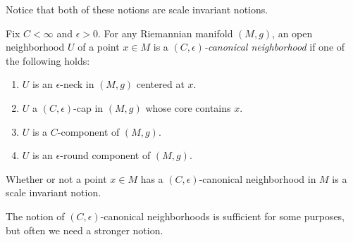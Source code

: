 Notice that both of these notions are scale invariant notions.

\begin{definition}\label{def:canonical-neighborhood}
Fix $C<\infty$ and $\epsilon>0$. For any Riemannian manifold
$(M,g)$,  an open neighborhood $U$ of a point $x\in M$ is a {\em
$(C,\epsilon)$-canonical neighborhood} if one of the following holds:
\begin{enumerate}
\item[(1)] $U$ is an $\epsilon$-neck in $(M,g)$ centered at $x$.
\item[(2)] $U$ a $(C,\epsilon)$-cap in $(M,g)$ whose core contains $x$.
\item[(3)] $U$ is a $C$-component of $(M,g)$.
\item[(4)] $U$ is  an $\epsilon$-round component of $(M,g)$.
\end{enumerate}
\end{definition}

Whether or not a point $x\in M$ has a $(C,\epsilon)$-canonical
neighborhood in $M$ is a scale invariant notion.

The notion of $(C,\epsilon)$-canonical neighborhoods is sufficient
for some purposes, but often we need a stronger notion.


